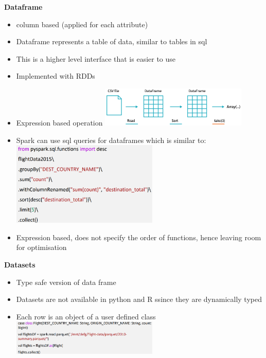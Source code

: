 \documentclass[10pt, landscape]{article}
\begin{document}
\begin{multicols}{4}
\textbf{Dataframe}
\begin{itemize}
  \item column based (applied for each attribute)
  \item Dataframe represents a table of data, similar to tables in sql 
  \item This is a higher level interface that is easier to use 
  \item Implemented with RDDs 
  \item Expression based operation
  \includegraphics*[width=7cm]{dataframe1}
  \item Spark can use sql queries for dataframes which is similar to:
  \includegraphics*[width=7cm]{df2}
  \item Expression based, does not specify the order of functions, hence leaving room for optimisation 
\end{itemize}

\textbf{Datasets}
\begin{itemize}
  \item Type safe version of data frame
  \item Datasets are not available in python and R ssince they are dynamically typed 
  \item Each row is an object of a user defined class
  \includegraphics*[width=7cm]{ds1}
\end{itemize}


\end{multicols}
\end{document}
